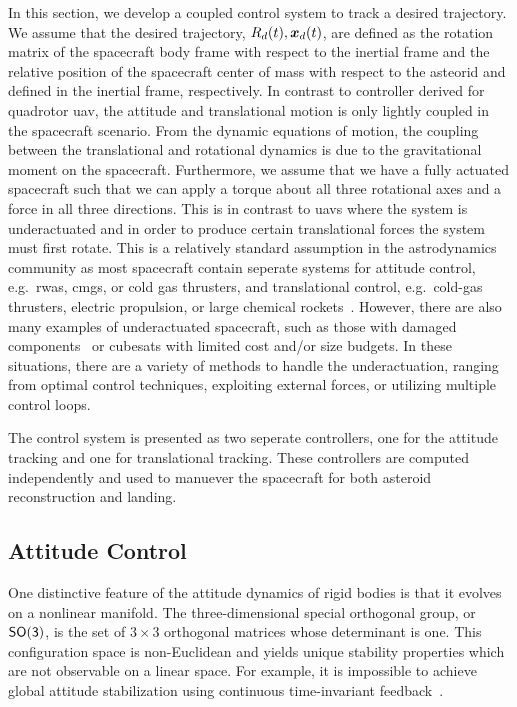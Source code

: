 In this section, we develop a coupled control system to track a desired trajectory.
We assume that the desired trajectory, \( R_d(t), \bm{x}_d(t) \), are defined as the rotation matrix of the spacecraft body frame with respect to the inertial frame and the relative position of the spacecraft center of mass with respect to the asteorid and defined in the inertial frame, respectively.
In contrast to controller derived for quadrotor \gls{uav}, the attitude and translational motion is only lightly coupled in the spacecraft scenario.
From the dynamic equations of motion, the coupling between the translational and rotational dynamics is due to the gravitational moment on the spacecraft.
Furthermore, we assume that we have a fully actuated spacecraft such that we can apply a torque about all three rotational axes and a force in all three directions.
This is in contrast to \glspl{uav} where the system is underactuated and in order to produce certain translational forces the system must first rotate.
This is a relatively standard assumption in the astrodynamics community as most spacecraft contain seperate systems for attitude control, e.g.\ \glspl{rwa}, \glspl{cmg}, or cold gas thrusters, and translational control, e.g.\ cold-gas thrusters, electric propulsion, or large chemical rockets~\cite{hughes2004,wertz1978}.
However, there are also many examples of underactuated spacecraft, such as those with damaged components~\cite{petersen2015a} or cubesats with limited cost and/or size budgets.
In these situations, there are a variety of methods to handle the underactuation, ranging from optimal control techniques, exploiting external forces, or utilizing multiple control loops.

The control system is presented as two seperate controllers, one for the attitude tracking and one for translational tracking. 
These controllers are computed independently and used to manuever the spacecraft for both asteroid reconstruction and landing.

\subsection{Attitude Control}
One distinctive feature of the attitude dynamics of rigid bodies is that it evolves on a nonlinear manifold.
The three-dimensional special orthogonal group, or \( \mathsf{SO(3)} \), is the set of \( 3 \times 3 \) orthogonal matrices whose determinant is one.
This configuration space is non-Euclidean and yields unique stability properties which are not observable on a linear space.
For example, it is impossible to achieve global attitude stabilization using continuous time-invariant feedback~\cite{bhat2000}.

